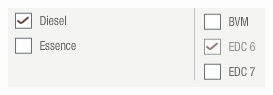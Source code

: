\begin{figure}[!ht]
\centering
\includegraphics[scale=0.5]{figures/configuratorRenault.png}
\vspace*{-2mm}
\end{figure}









